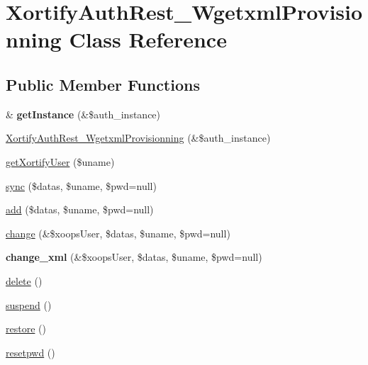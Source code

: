 \hypertarget{class_xortify_auth_rest___wgetxml_provisionning}{\section{Xortify\-Auth\-Rest\-\_\-\-Wgetxml\-Provisionning Class Reference}
\label{class_xortify_auth_rest___wgetxml_provisionning}
}
\subsection*{Public Member Functions}
\begin{DoxyCompactItemize}
\item 
\hypertarget{class_xortify_auth_rest___wgetxml_provisionning_a2c8eaa915c70d75289ac8a03686194f9}{\& {\bfseries get\-Instance} (\&\$auth\-\_\-instance)}\label{class_xortify_auth_rest___wgetxml_provisionning_a2c8eaa915c70d75289ac8a03686194f9}

\item 
\hyperlink{class_xortify_auth_rest___wgetxml_provisionning_af423120961930c8e60cca3d8db6ab8fe}{Xortify\-Auth\-Rest\-\_\-\-Wgetxml\-Provisionning} (\&\$auth\-\_\-instance)
\item 
\hyperlink{class_xortify_auth_rest___wgetxml_provisionning_a041d726ac26672547ed1504e8e0117aa}{get\-Xortify\-User} (\$uname)
\item 
\hyperlink{class_xortify_auth_rest___wgetxml_provisionning_a35dc08b0f2138eb818ff95345b73bcff}{sync} (\$datas, \$uname, \$pwd=null)
\item 
\hyperlink{class_xortify_auth_rest___wgetxml_provisionning_adfc9fcef01e7bd7b2f47e8e79d51fc63}{add} (\$datas, \$uname, \$pwd=null)
\item 
\hyperlink{class_xortify_auth_rest___wgetxml_provisionning_ae1f0971b9712c794620cf309164e43af}{change} (\&\$xoops\-User, \$datas, \$uname, \$pwd=null)
\item 
\hypertarget{class_xortify_auth_rest___wgetxml_provisionning_ab594a8b13e8777f281050b8e348be6c2}{{\bfseries change\-\_\-xml} (\&\$xoops\-User, \$datas, \$uname, \$pwd=null)}\label{class_xortify_auth_rest___wgetxml_provisionning_ab594a8b13e8777f281050b8e348be6c2}

\item 
\hyperlink{class_xortify_auth_rest___wgetxml_provisionning_a13bdffdd926f26b825ea57066334ff01}{delete} ()
\item 
\hyperlink{class_xortify_auth_rest___wgetxml_provisionning_ad73006a505121228f3b075c2409787d2}{suspend} ()
\item 
\hyperlink{class_xortify_auth_rest___wgetxml_provisionning_aa1371f22826cf8cde4454c9b467203d0}{restore} ()
\item 
\hyperlink{class_xortify_auth_rest___wgetxml_provisionning_a06d70fbd3a2db390b6f2530c0076628e}{resetpwd} ()
\end{DoxyCompactItemize}
